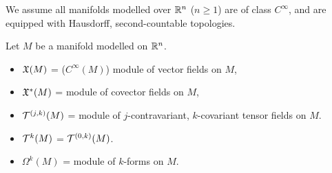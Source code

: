 \documentclass[../main-v2-manifolds.tex]{subfiles}
\begin{document}

\providecommand{\symatrix}{\begin{bmatrix}
    0 & 1 \\ -1 & 0
\end{bmatrix}}
\newcommand{\bigdot}[1]{\overset{\bullet}{#1}}
\providecommand{\realtn}{{\real^{2n}}}
\begin{remark}
    We assume all manifolds modelled over ${\mathbb{R}^n}$ ($n\geq 1$) are of class $C^\infty$, and are equipped with Hausdorff, second-countable topologies.
\end{remark}
Let $M$ be a manifold modelled on ${\mathbb{R}^n}$.
\begin{multicols}{2}
\begin{itemize}
    \item $\mathfrak{X}(M)$ = ($C^\infty(M)$) module of vector fields on $M$,
    \item $\mathfrak{X}^*(M)$ = module of covector fields on $M$,
    \item $\mathcal{T}^{(j,k)}(M)$ = module of $j$-contravariant, $k$-covariant tensor fields on $M$.
    \item $\mathcal{T}^{k}(M)$ = $\mathcal{T}^{(0,k)}(M)$.
    \item $\Omega^k(M)$ = module of $k$-forms on $M$.
\end{itemize}
\end{multicols}
\end{document}
